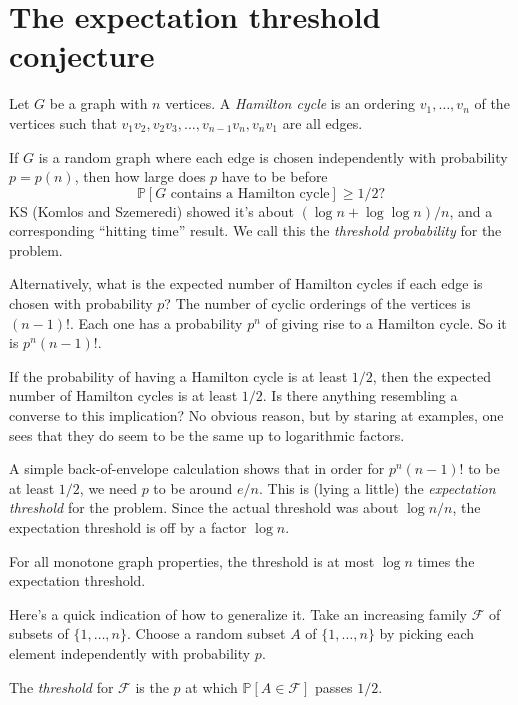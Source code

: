 \documentclass[reqno]{amsart} 
\begin{document}
\section{The expectation threshold conjecture}

Let $G$ be a graph with $n$ vertices.  A \emph{Hamilton cycle} is an ordering $v_1, \dotsc, v_n$ of the vertices such that $v_1 v_2, v_2 v_3, \dotsc, v_{n - 1} v_n, v_n v_1$ are all edges.

If $G$ is a random graph where each edge is chosen independently with probability $p =p(n)$, then how large does $p$ have to be before
\begin{equation*}
  \mathbb{P}[\text{$G$ contains a Hamilton cycle}] \geq 1/2?
\end{equation*}
KS (Komlos and Szemeredi) showed it's about $(\log n + \log \log n) / n$, and a corresponding ``hitting time'' result.  We call this the \emph{threshold probability} for the problem.

Alternatively, what is the expected number of Hamilton cycles if each edge is chosen with probability $p$?  The number of cyclic orderings of the vertices is $(n - 1)!$.  Each one has a probability $p^n$ of giving rise to a Hamilton cycle.  So it is $p^n(n - 1)!$.

If the probability of having a Hamilton cycle is at least $1/2$, then the expected number of Hamilton cycles is at least $1/2$.  Is there anything resembling a converse to this implication?  No obvious reason, but by staring at examples, one sees that they do seem to be the same up to logarithmic factors.

A simple back-of-envelope calculation shows that in order for $p^n(n - 1)!$ to be at least $1/2$, we need $p$ to be around $e /n$.  This is (lying a little) the \emph{expectation threshold} for the problem.  Since the actual threshold was about $\log n / n$, the expectation threshold is off by a factor $\log n$.

\begin{conjecture}
  For all monotone graph properties, the threshold is at most $\log n$ times the expectation threshold.
\end{conjecture}

Here's a quick indication of how to generalize it.  Take an increasing family $\mathcal{F}$ of subsets of $\{1, \dotsc, n\}$.  Choose a random subset $A$ of $\{1, \dotsc, n\}$ by picking each element independently with probability $p$.

The \emph{threshold} for $\mathcal{F}$ is the $p$ at which $\mathbb{P}[A \in \mathcal{F}]$ passes $1/2$.
\end{document}
